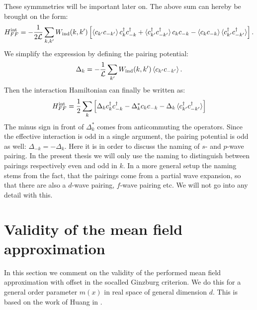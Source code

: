 These symmmetries will be important later on. The above sum can hereby be brought on the form:
\begin{equation}
H^\text{int}_{FF} = -\frac{1}{2\mathcal{L}}\sum_{k,k'} W_{\text{ind}}(k,k')\left[ \braket{ c_{k'}c_{-k'}} c^\dagger_k c^\dagger_{-k} + \braket {c^\dagger_{k'}c^\dagger_{-k'}} c_k c_{-k} - \braket {c_{k}c_{-k}} \braket {c^\dagger_{k'}c^\dagger_{-k'}} \right]. \nonumber
\end{equation}
We simplify the expression by defining the pairing potential:
\begin{equation}
\Delta_k = -\frac{1}{\mathcal{L}}\sum_{k'}W_{\text{ind}}(k,k')\braket {c_{k'}c_{-k'}}.
\label{eq.pairingpotentialdef}
\end{equation}
Then the interaction Hamiltonian can finally be written as:
\begin{equation}
H^\text{int}_{FF} = \frac{1}{2}\sum_{k} \left[ \Delta_k c^\dagger_k c^\dagger_{-k} - \Delta^*_k c_k c_{-k} - \Delta_k \braket {c^\dagger_{k'}c^\dagger_{-k'}} \right]
\label{eq.HFFintfinal}
\end{equation}
The minus sign in front of $\Delta^*_k$ comes from anticommuting the operators. Since the effective interaction is odd in a single argument, the pairing potential is odd as well: $\Delta_{-k} = -\Delta_k$. Here it is in order to discuss the naming of $s$- and $p$-wave pairing. In the present thesis we will only use the naming to distinguish between pairings respectively even and odd in $k$. In a more general setup the naming stems from the fact, that the pairings come from a partial wave expansion, so that there are also a $d$-wave pairing, $f$-wave pairing etc. We will not go into any detail with this.

\section{Validity of the mean field approximation} \label{sec.meanfieldvalidity}
In this section we comment on the validity of the performed mean field approximation with offset in the socalled Ginzburg criterion. We do this for a general order parameter $m(x)$ in real space of general dimension $d$. This is based on the work of Huang in \cite[chapter 17]{HuangStatMech}. 

